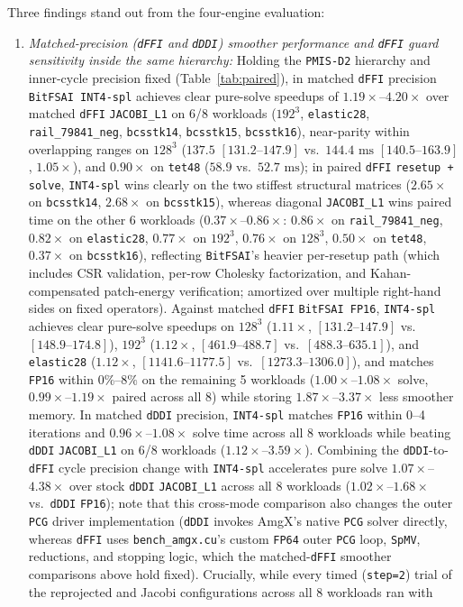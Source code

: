 \documentclass[10pt]{article}
\begin{document}
Three findings stand out from the four-engine evaluation:
\begin{enumerate}
  \item \emph{Matched-precision (\texttt{dFFI} and \texttt{dDDI}) smoother performance and \texttt{dFFI} guard sensitivity inside the same hierarchy:} Holding the \texttt{PMIS-D2} hierarchy and inner-cycle precision fixed (Table~\ref{tab:paired}), in matched \texttt{dFFI} precision \texttt{BitFSAI INT4-spl} achieves clear pure-solve speedups of $\mathbf{1.19\times\text{--}4.20\times}$ over matched \texttt{dFFI} \texttt{JACOBI\_L1} on 6/8 workloads ($192^3$, \texttt{elastic28}, \texttt{rail\_79841\_neg}, \texttt{bcsstk14}, \texttt{bcsstk15}, \texttt{bcsstk16}), near-parity within overlapping ranges on $128^3$ ($137.5$ $[131.2\text{--}147.9]$ vs.\ $144.4\text{ ms}$ $[140.5\text{--}163.9]$, $1.05\times$), and $0.90\times$ on \texttt{tet48} ($58.9$ vs.\ $52.7\text{ ms}$); in paired \texttt{dFFI} \texttt{resetup + solve}, \texttt{INT4-spl} wins clearly on the two stiffest structural matrices ($2.65\times$ on \texttt{bcsstk14}, $2.68\times$ on \texttt{bcsstk15}), whereas diagonal \texttt{JACOBI\_L1} wins paired time on the other 6 workloads ($0.37\times$--$0.86\times$: $0.86\times$ on \texttt{rail\_79841\_neg}, $0.82\times$ on \texttt{elastic28}, $0.77\times$ on $192^3$, $0.76\times$ on $128^3$, $0.50\times$ on \texttt{tet48}, $0.37\times$ on \texttt{bcsstk16}), reflecting \texttt{BitFSAI}'s heavier per-resetup path (which includes CSR validation, per-row Cholesky factorization, and Kahan-compensated patch-energy verification; amortized over multiple right-hand sides on fixed operators). Against matched \texttt{dFFI} \texttt{BitFSAI FP16}, \texttt{INT4-spl} achieves clear pure-solve speedups on $128^3$ ($1.11\times$, $[131.2\text{--}147.9]$ vs.\ $[148.9\text{--}174.8]$), $192^3$ ($1.12\times$, $[461.9\text{--}488.7]$ vs.\ $[488.3\text{--}635.1]$), and \texttt{elastic28} ($1.12\times$, $[1141.6\text{--}1177.5]$ vs.\ $[1273.3\text{--}1306.0]$), and matches \texttt{FP16} within $0\%$--$8\%$ on the remaining 5 workloads ($1.00\times$--$1.08\times$ solve, $0.99\times$--$1.19\times$ paired across all 8) while storing $1.87\times$--$3.37\times$ less smoother memory. In matched \texttt{dDDI} precision, \texttt{INT4-spl} matches \texttt{FP16} within 0--4 iterations and $0.96\times$--$1.08\times$ solve time across all 8 workloads while beating \texttt{dDDI} \texttt{JACOBI\_L1} on 6/8 workloads ($1.12\times$--$3.59\times$). Combining the \texttt{dDDI}-to-\texttt{dFFI} cycle precision change with \texttt{INT4-spl} accelerates pure solve $1.07\times$--$4.38\times$ over stock \texttt{dDDI} \texttt{JACOBI\_L1} across all 8 workloads ($1.02\times$--$1.68\times$ vs.\ \texttt{dDDI} \texttt{FP16}); note that this cross-mode comparison also changes the outer \texttt{PCG} driver implementation (\texttt{dDDI} invokes AmgX's native \texttt{PCG} solver directly, whereas \texttt{dFFI} uses \texttt{bench\_amgx.cu}'s custom \texttt{FP64} outer \texttt{PCG} loop, \texttt{SpMV}, reductions, and stopping logic, which the matched-\texttt{dFFI} smoother comparisons above hold fixed). Crucially, while every timed (\texttt{step=2}) trial of the reprojected and Jacobi configurations across all 8 workloads ran with 
\end{enumerate}
\end{document}

